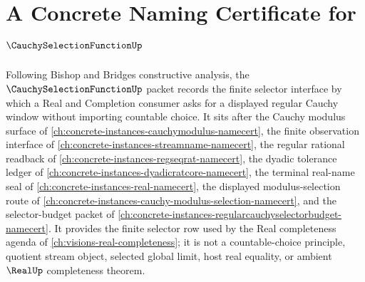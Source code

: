 \chapter{A Concrete Naming Certificate for $\CauchySelectionFunctionUp$}
\label{ch:concrete-instances-cauchy-selection-function-namecert}

Following Bishop and Bridges constructive analysis, the $\CauchySelectionFunctionUp$ packet records the finite selector interface by which a Real and Completion consumer asks for a displayed regular Cauchy window without importing countable choice. It sits after the Cauchy modulus surface of \autoref{ch:concrete-instances-cauchymodulus-namecert}, the finite observation interface of \autoref{ch:concrete-instances-streamname-namecert}, the regular rational readback of \autoref{ch:concrete-instances-regseqrat-namecert}, the dyadic tolerance ledger of \autoref{ch:concrete-instances-dyadicratcore-namecert}, the terminal real-name seal of \autoref{ch:concrete-instances-real-namecert}, the displayed modulus-selection route of \autoref{ch:concrete-instances-cauchy-modulus-selection-namecert}, and the selector-budget packet of \autoref{ch:concrete-instances-regularcauchyselectorbudget-namecert}. It provides the finite selector row used by the Real completeness agenda of \autoref{ch:visions-real-completeness}; it is not a countable-choice principle, quotient stream object, selected global limit, host real equality, or ambient $\RealUp$ completeness theorem.

